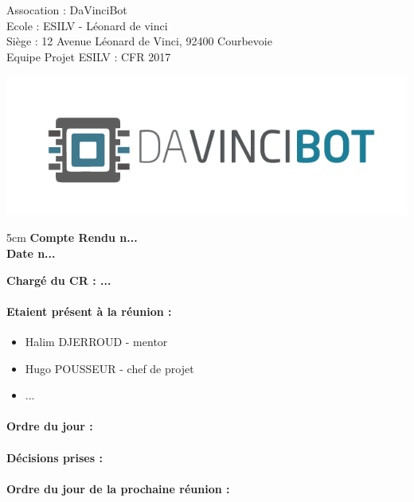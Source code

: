 \documentclass[12pt]{report}
\begin{document}
\begin{minipage}{0.55\linewidth}
\noindent Assocation : DaVinciBot\\
Ecole : ESILV - Léonard de vinci\\
Siège :  12 Avenue Léonard de Vinci, 92400 Courbevoie\\
Equipe Projet ESILV : CFR 2017\\
\end{minipage}\hfill
\begin{minipage}{0.3\linewidth}
\includegraphics[scale = 0.2]{img/logo_assos.png}
\end{minipage}
\vspace{1cm}



\begin{center}
\begin {boxedminipage} [ poslb ] { 5cm}
\textbf{Compte Rendu n...}\\
\textbf{Date n...}
\end {boxedminipage}
\end{center}
\textbf{Chargé du CR : ...}

\vspace{1cm}

\paragraph{Etaient présent à la réunion :}
\begin{itemize}
\item Halim DJERROUD - mentor
\item Hugo POUSSEUR - chef de projet
\item ...
\end{itemize}


\paragraph{Ordre du jour :}

\paragraph{Décisions prises :}

\paragraph{Ordre du jour de la prochaine réunion :}
\end{document}
